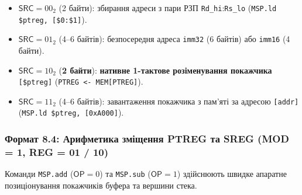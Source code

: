 \documentclass[11pt,a4paper]{article}
\newcommand{\reg}[1]{\texttt{#1}}
\newcommand{\field}[1]{\textsf{#1}}
\begin{document}
\begin{itemize}
  \item $\field{SRC} = 00_2$ (2 байти): збирання адреси з пари РЗП \reg{Rd\_hi}:\reg{Rs\_lo} (\texttt{MSP.ld \$ptreg, [\$0:\$1]}).
  \item $\field{SRC} = 01_2$ (4--6 байтів): безпосередня адреса \texttt{imm32} (6 байтів) або \texttt{imm16} (4 байти).
  \item $\field{SRC} = 10_2$ (\textbf{2 байти}): \textbf{нативне 1-тактове розіменування покажчика} \texttt{[\$ptreg]} (\texttt{PTREG <- MEM[PTREG]}).
  \item $\field{SRC} = 11_2$ (4--6 байтів): завантаження покажчика з пам'яті за адресою \texttt{[addr]} (\texttt{MSP.ld \$ptreg, [0xA000]}).
\end{itemize}

\subsubsection{Формат 8.4: Арифметика зміщення PTREG та SREG (MOD = 1, REG = 01 / 10)}
Команди \texttt{MSP.add} ($\field{OP}=0$) та \texttt{MSP.sub} ($\field{OP}=1$) здійснюють швидке апаратне позиціонування покажчиків буфера та вершини стека.
\end{document}
